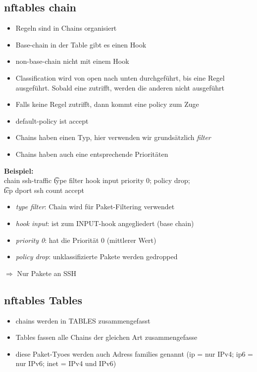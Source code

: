 \documentclass{report}
\theoremstyle{definition}
\theoremstyle{example}
\begin{document}
	\subsection{nftables chain}
\begin{itemize}
	\item Regeln sind in Chains organisiert
	\item Base-chain in der Table gibt es einen Hook
	\item non-base-chain nicht mit einem Hook
	\item Classification wird von open nach unten durchgeführt, bis eine Regel ausgeführt. Sobald eine zutrifft, werden die anderen nicht ausgeführt
	\item Falls keine Regel zutrifft, dann kommt eine policy zum Zuge
	\item default-policy ist accept
	\item Chains haben einen Typ, hier verwenden wir grundsätzlich \textit{filter}
	\item Chains haben auch eine entsprechende Prioritäten
\end{itemize}

\textbf{Beispiel:}\\
chain ssh-traffic {
\t type filter hook input priority 0; policy drop;\\
\t tcp dport ssh count accept
}

\begin{itemize}
	\item \textit{type filter}: Chain wird für Paket-Filtering verwendet
	\item \textit{hook input}: ist zum INPUT-hook angegliedert (base chain)
	\item \textit{priority 0}: hat die Priorität 0 (mittlerer Wert)
	\item \textit{policy drop}: unklassifizierte Pakete werden gedropped
\end{itemize}
$\Rightarrow$ Nur Pakete an SSH

	\subsection{nftables Tables}
\begin{itemize}
	\item chains werden in TABLES zusammengefasst
	\item Tables fassen alle Chains der gleichen Art zusammengefasse
	\item diese Paket-Tyoes werden auch Adress families genannt (ip = nur IPv4; ip6 = nur IPv6; inet = IPv4 und IPv6)
\end{itemize}
\end{document}
